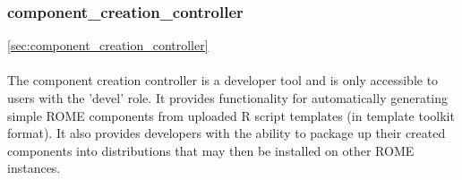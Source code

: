 \subsubsection{component_creation_controller}
\ref{sec:component_creation_controller}

\paragraph{}
The component creation controller is a developer tool and is only accessible to users with the 'devel' role. It provides functionality for automatically generating simple ROME components from uploaded R script templates (in template toolkit format). It also provides developers with the ability to package up their created components into distributions that may then be installed on other ROME instances.

